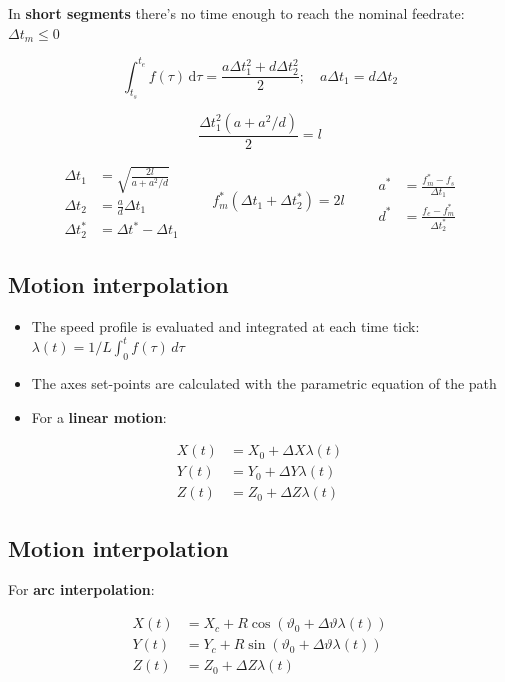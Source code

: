 \documentclass[
  letterpaper,
  DIV=11,
  numbers=noendperiod]{scrartcl}
\providecommand{\tightlist}{%
  \setlength{\itemsep}{0pt}\setlength{\parskip}{0pt}}
\begin{document}
In \textbf{short segments} there's no time enough to reach the nominal
feedrate: \(\Delta t_m \le 0\)

\[
\int_{t_s}^{t_e} f(\tau)\,\mathrm{d}\tau = \frac{a\Delta t_1^2 + d\Delta t_2^2}{2}; \quad a\Delta t_1 = d\Delta t_2
\]

\[
\frac{\Delta t_1^2 (a + a^2/d)}{2} = l
\]

\[
\begin{aligned}
\Delta t_1 &= \sqrt{\frac{2l}{a + a^2/d}} \\
\Delta t_2 &= \frac{a}{d}\Delta t_1 \\
\Delta t_2^* &= \Delta t^* - \Delta t_1
\end{aligned}
\qquad
f_m^*(\Delta t_1 + \Delta t_2^*) = 2l
\qquad
\begin{aligned}
a^* &= \frac{f_m^* - f_s}{\Delta t_1} \\
d^* &= \frac{f_e - f_m^*}{\Delta t_2^*}
\end{aligned}
\]

\subsection{Motion interpolation}\label{motion-interpolation}

\begin{itemize}
\tightlist
\item
  The speed profile is evaluated and integrated at each time tick:
  \(\lambda(t) = 1/L\int_0^t f(\tau)\,d\tau\)
\item
  The axes set-points are calculated with the parametric equation of the
  path
\item
  For a \textbf{linear motion}:
\end{itemize}

\[
\begin{aligned}
X(t) &= X_0 + \Delta X \lambda(t) \\
Y(t) &= Y_0 + \Delta Y \lambda(t) \\
Z(t) &= Z_0 + \Delta Z \lambda(t)
\end{aligned}
\]

\subsection{Motion interpolation}\label{motion-interpolation-1}

For \textbf{arc interpolation}:

\[
\begin{aligned}
X(t) &= X_c + R\cos(\vartheta_0 + \Delta\vartheta \lambda(t)) \\
Y(t) &= Y_c + R\sin(\vartheta_0 + \Delta\vartheta \lambda(t)) \\
Z(t) &= Z_0 + \Delta Z \lambda(t)
\end{aligned}
\]
\end{document}
